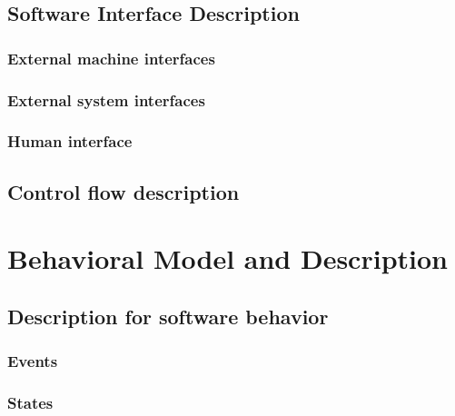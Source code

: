 \documentclass{article}
\begin{document}
\subsection{Software Interface Description}

\subsubsection{External machine interfaces}

\subsubsection{External system interfaces}

\subsubsection{Human interface}

\subsection{Control flow description}

\section{ Behavioral Model and Description}

\subsection{Description for software behavior}

\subsubsection{Events}

\subsubsection{States}
\end{document}
